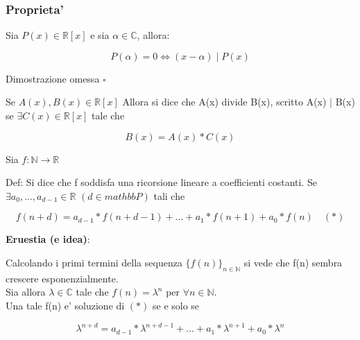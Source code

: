 \documentclass{article}
\begin{document}
        \subsubsection{Proprieta'}
        \begin{flushleft}
          Sia $P(x) \in \mathbb{R}[x]$ e sia $\alpha \in \mathbb{C}$, allora:
        \end{flushleft}
        \begin{equation}
          P(\alpha)=0 \iff (x-\alpha) \mid P(x)
        \end{equation}
        \begin{flushleft}
          Dimostrazione omessa $\square$
        \end{flushleft}
        \begin{flushleft}
          Se $A(x),B(x) \in \mathbb{R}[x]$ Allora si dice che A(x) divide B(x), scritto A(x) $\mid$ B(x) se $\exists C(x) \in \mathbb{R}[x]$ tale che
        \end{flushleft}
        \begin{equation}
          B(x)=A(x)*C(x)
        \end{equation}
        \begin{flushleft}
          Sia $f: \mathbb{N} \to \mathbb{R}$
        \end{flushleft}
        \begin{flushleft}
          Def: Si dice che f soddisfa una ricorsione lineare a coefficienti costanti. Se $\exists a_0,...,a_{d-1} \in \mathbb{R}$ $(d \in mathbb{P})$ tali che 
        \end{flushleft}
        \begin{equation}
          f(n+d)= a_{d-1}*f(n+d-1)+...+a_1*f(n+1)+a_0*f(n) \quad (*)
        \end{equation}
        \begin{flushleft}
          \textbf{Eruestia (e idea)}:
        \end{flushleft}
        \begin{flushleft}
          Calcolando i primi termini della sequenza $\{ f(n)\}_{n\in \mathbb{N}}$ si vede che f(n) sembra crescere esponenzialmente. \\ 
          Sia allora $\lambda \in \mathbb{C}$ tale che $f(n)=\lambda^n$ per $\forall n \in \mathbb{N}$. \\
          Una tale f(n) e' soluzione di $(*)$ se e solo se
        \end{flushleft}
        \begin{equation}
          \lambda^{n+d}=a_{d-1}*\lambda^{n+d-1}+...+a_1*\lambda^{n+1}+a_0*\lambda^n
        \end{equation}
\end{document}
